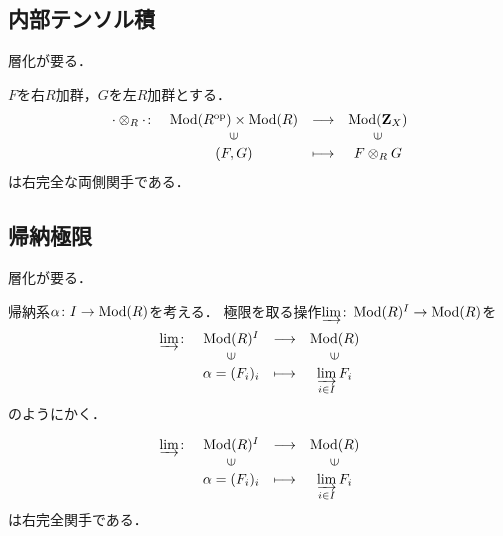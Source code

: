 \subsection{内部テンソル積}
層化が要る．

\begin{PRP}
    $F$を右$R$加群，$G$を左$R$加群とする．
    \begin{equation*}
        \begin{array}{rccc}
            {\cdot}\otimes_R{\cdot}\colon
            &\Mod(R^{\op})\times\Mod(R)
            &\longrightarrow&\Mod(\zz_X)\\
            &\rotatebox{90}{$\in$}&&\rotatebox{90}{$\in$}\\
            & (F,G)&\longmapsto&F\otimes_R G
        \end{array}
    \end{equation*}
    は右完全な両側関手である．
\end{PRP}

\subsection{帰納極限}
層化が要る．

帰納系$\alpha\colon I\to \mathop{\mathrm{Mod}}\nolimits(R)$を考える．
極限を取る操作$\varinjlim\colon\mathop{\mathrm{Mod}}\nolimits(R)^I\to\mathop{\mathrm{Mod}}\nolimits(R)$を
\begin{equation*}
    \begin{array}{rccc}
        \varinjlim\colon&\Mod(R)^I&\longrightarrow&\Mod(R)\\
            &\rotatebox{90}{$\in$}&&\rotatebox{90}{$\in$}\\
            &\alpha=(F_i)_i &\longmapsto&\varinjlim\limits_{i\in I}F_i
    \end{array}
\end{equation*}
のようにかく．

\begin{PRP}
    \begin{equation*}
        \begin{array}{rccc}
            \varinjlim\colon&\Mod(R)^I&\longrightarrow&\Mod(R)\\
                &\rotatebox{90}{$\in$}&&\rotatebox{90}{$\in$}\\
                &\alpha=(F_i)_i &\longmapsto&\varinjlim\limits_{i\in I}F_i
        \end{array}
    \end{equation*}
    は右完全関手である．        
\end{PRP}


